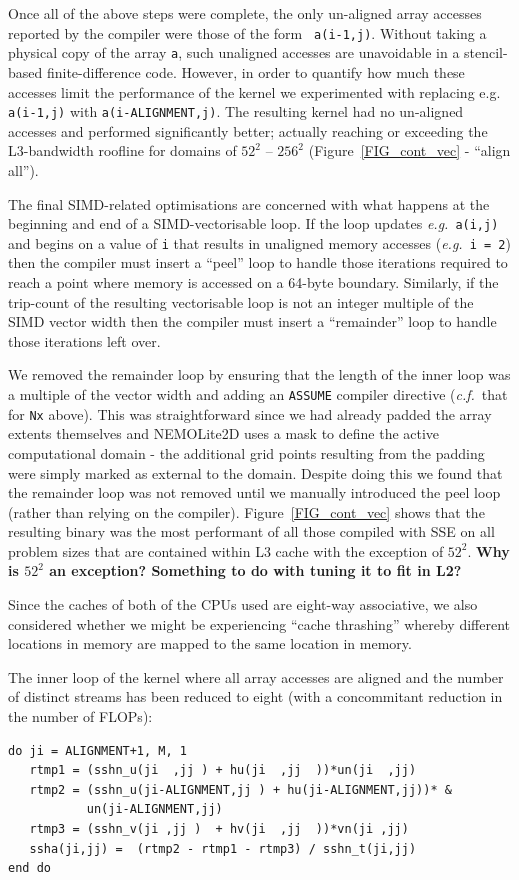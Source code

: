 \documentclass[12pt]{article}
\begin{document}
Once all of the above steps were complete, the only un-aligned array
accesses reported by the compiler were those of the form {\tt
  a(i-1,j)}. Without taking a physical copy of the array {\tt a}, such
unaligned accesses are unavoidable in a stencil-based
finite-difference code. However, in order to quantify how much these
accesses limit the performance of the kernel we experimented with
replacing e.g. {\tt a(i-1,j)} with {\tt a(i-ALIGNMENT,j)}. The
resulting kernel had no un-aligned accesses and performed
significantly better; actually reaching or exceeding the L3-bandwidth
roofline for domains of $52^2$ -- $256^2$ (Figure~\ref{FIG_cont_vec} -
``align all'').

The final SIMD-related optimisations are concerned with what happens
at the beginning and end of a SIMD-vectorisable loop. If the loop
updates {\it e.g.}\ {\tt a(i,j)} and begins on a value of {\tt i} that
results in unaligned memory accesses ({\it e.g.}\ {\tt i = 2}) then
the compiler must insert a ``peel'' loop to handle those iterations
required to reach a point where memory is accessed on a 64-byte
boundary.  Similarly, if the trip-count of the resulting vectorisable
loop is not an integer multiple of the SIMD vector width then the
compiler must insert a ``remainder'' loop to handle those iterations
left over.

We removed the remainder loop by ensuring that the length of the inner
loop was a multiple of the vector width and adding an {\tt ASSUME}
compiler directive ({\it c.f.}\ that for {\tt Nx} above). This was
straightforward since we had already padded the array extents
themselves and NEMOLite2D uses a mask to define the active
computational domain - the additional grid points resulting from the
padding were simply marked as external to the domain.  Despite doing
this we found that the remainder loop was not removed until we
manually introduced the peel loop (rather than relying on the
compiler). Figure~\ref{FIG_cont_vec} shows that the resulting binary
was the most performant of all those compiled with SSE on all problem
sizes that are contained within L3 cache with the exception of $52^2$.
{\bf Why is $52^2$ an exception? Something to do with tuning it to fit in L2?}

Since the caches of both of the CPUs used are eight-way associative,
we also considered whether we might be experiencing ``cache
thrashing'' whereby different locations in memory are mapped to the
same location in memory.

The inner loop of the kernel where all array accesses are aligned and
the number of distinct streams has been reduced to eight (with a
concommitant reduction in the number of FLOPs):
\begin{verbatim}
do ji = ALIGNMENT+1, M, 1
   rtmp1 = (sshn_u(ji  ,jj ) + hu(ji  ,jj  ))*un(ji  ,jj)
   rtmp2 = (sshn_u(ji-ALIGNMENT,jj ) + hu(ji-ALIGNMENT,jj))* &
           un(ji-ALIGNMENT,jj)
   rtmp3 = (sshn_v(ji ,jj )  + hv(ji  ,jj  ))*vn(ji ,jj)
   ssha(ji,jj) =  (rtmp2 - rtmp1 - rtmp3) / sshn_t(ji,jj)
end do
\end{verbatim}
\end{document}
